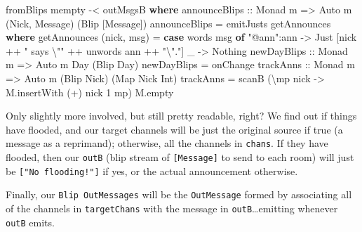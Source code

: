 \documentclass[]{article}
\newenvironment{Shaded}{}{}
\newcommand{\DataTypeTok}[1]{\textcolor[rgb]{0.56,0.13,0.00}{#1}}
\newcommand{\DecValTok}[1]{\textcolor[rgb]{0.25,0.63,0.44}{#1}}
\newcommand{\FunctionTok}[1]{\textcolor[rgb]{0.02,0.16,0.49}{#1}}
\newcommand{\KeywordTok}[1]{\textcolor[rgb]{0.00,0.44,0.13}{\textbf{#1}}}
\newcommand{\NormalTok}[1]{#1}
\newcommand{\OperatorTok}[1]{\textcolor[rgb]{0.40,0.40,0.40}{#1}}
\newcommand{\OtherTok}[1]{\textcolor[rgb]{0.00,0.44,0.13}{#1}}
\newcommand{\StringTok}[1]{\textcolor[rgb]{0.25,0.44,0.63}{#1}}
\begin{document}
\begin{Shaded}
\begin{Highlighting}[]
\NormalTok{    fromBlips }\FunctionTok{mempty} \OperatorTok{{-}\textless{}}\NormalTok{ outMsgsB}
  \KeywordTok{where}
\OtherTok{    announceBlips ::} \DataTypeTok{Monad}\NormalTok{ m }\OtherTok{=\textgreater{}} \DataTypeTok{Auto}\NormalTok{ m (}\DataTypeTok{Nick}\NormalTok{, }\DataTypeTok{Message}\NormalTok{) (}\DataTypeTok{Blip}\NormalTok{ [}\DataTypeTok{Message}\NormalTok{])}
\NormalTok{    announceBlips }\OtherTok{=}\NormalTok{ emitJusts getAnnounces}
      \KeywordTok{where}
\NormalTok{        getAnnounces (nick, msg) }\OtherTok{=}
          \KeywordTok{case} \FunctionTok{words}\NormalTok{ msg }\KeywordTok{of}
            \StringTok{"@ann"}\OperatorTok{:}\NormalTok{ann }\OtherTok{{-}\textgreater{}} \DataTypeTok{Just}\NormalTok{ [nick }\OperatorTok{++} \StringTok{" says \textbackslash{}""} \OperatorTok{++} \FunctionTok{unwords}\NormalTok{ ann }\OperatorTok{++} \StringTok{"\textbackslash{}"."}\NormalTok{]}
\NormalTok{            \_          }\OtherTok{{-}\textgreater{}} \DataTypeTok{Nothing}
\OtherTok{    newDayBlips ::} \DataTypeTok{Monad}\NormalTok{ m }\OtherTok{=\textgreater{}} \DataTypeTok{Auto}\NormalTok{ m }\DataTypeTok{Day}\NormalTok{ (}\DataTypeTok{Blip} \DataTypeTok{Day}\NormalTok{)}
\NormalTok{    newDayBlips }\OtherTok{=}\NormalTok{ onChange}
\OtherTok{    trackAnns ::} \DataTypeTok{Monad}\NormalTok{ m }\OtherTok{=\textgreater{}} \DataTypeTok{Auto}\NormalTok{ m (}\DataTypeTok{Blip} \DataTypeTok{Nick}\NormalTok{) (}\DataTypeTok{Map} \DataTypeTok{Nick} \DataTypeTok{Int}\NormalTok{)}
\NormalTok{    trackAnns }\OtherTok{=}\NormalTok{ scanB (\textbackslash{}mp nick }\OtherTok{{-}\textgreater{}}\NormalTok{ M.insertWith (}\OperatorTok{+}\NormalTok{) nick }\DecValTok{1}\NormalTok{ mp) M.empty}
\end{Highlighting}
\end{Shaded}

Only slightly more involved, but still pretty readable, right? We find out if
things have flooded, and our target channels will be just the original source if
true (a message as a reprimand); otherwise, all the channels in \texttt{chans}.
If they have flooded, then our \texttt{outB} (blip stream of
\texttt{{[}Message{]}} to send to each room) will just be
\texttt{{[}"No\ flooding!"{]}} if yes, or the actual announcement otherwise.

Finally, our \texttt{Blip\ OutMessages} will be the \texttt{OutMessage} formed
by associating all of the channels in \texttt{targetChans} with the message in
\texttt{outB}\ldots emitting whenever \texttt{outB} emits.
\end{document}
